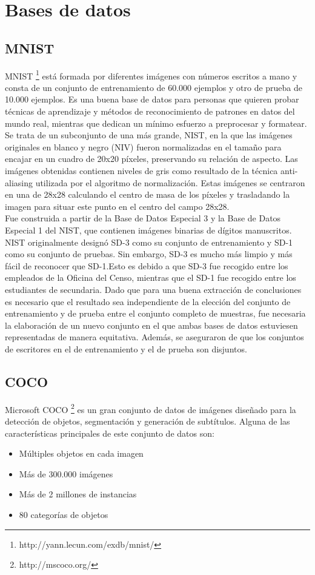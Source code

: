 \section{Bases de datos}
\subsection{MNIST}
MNIST \footnote{http://yann.lecun.com/exdb/mnist/} está formada por diferentes imágenes con números escritos a mano y consta de un conjunto de entrenamiento de 60.000 ejemplos y otro de prueba de 10.000 ejemplos. Es una buena base de datos para personas que quieren probar técnicas de aprendizaje y métodos de reconocimiento de patrones en datos del mundo real, mientras que dedican un mínimo esfuerzo a preprocesar y formatear. \\

Se trata de un subconjunto de una más grande, NIST, en la que las imágenes originales en blanco y negro (NIV) fueron normalizadas en el tamaño para encajar en un cuadro de 20x20 píxeles, preservando su relación de aspecto. Las imágenes obtenidas contienen niveles de gris como resultado de la técnica anti-aliasing utilizada por el algoritmo de normalización. Estas imágenes se centraron en una de 28x28 calculando el centro de masa de los píxeles y trasladando la imagen para situar este punto en el centro del campo 28x28.\\

Fue construida a partir de la Base de Datos Especial 3 y la Base de Datos Especial 1 del NIST, que contienen imágenes binarias de dígitos manuscritos. NIST originalmente designó SD-3 como su conjunto de entrenamiento y SD-1 como su conjunto de pruebas. Sin embargo, SD-3 es mucho más limpio y más fácil de reconocer que SD-1.Esto es debido a que SD-3 fue recogido entre los empleados de la Oficina del Censo, mientras que el SD-1 fue recogido entre los estudiantes de secundaria. Dado que para una buena extracción de conclusiones es necesario que el resultado sea independiente de la elección del conjunto de entrenamiento y de prueba entre el conjunto completo de muestras, fue necesaria la elaboración de un nuevo conjunto en el que ambas bases de datos estuviesen representadas de manera equitativa. Además, se aseguraron de que los conjuntos de escritores en el de entrenamiento y el de prueba son disjuntos.

\subsection{COCO}
Microsoft COCO \footnote{http://mscoco.org/} es un gran conjunto de datos de imágenes diseñado para la detección de objetos, segmentación y generación de subtítulos. Alguna de las características principales de este conjunto de datos son:
	\begin{itemize}
         \item Múltiples objetos en cada imagen
     	 \item Más de 300.000 imágenes
         \item Más de 2 millones de instancias
         \item 80 categorías de objetos
    \end{itemize}
    
